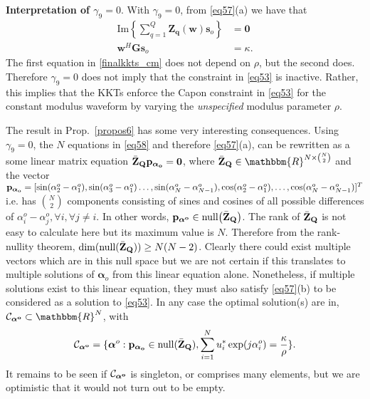 \documentclass[11pt,draftclsnofoot,onecolumn]{IEEEtran}
\theoremstyle{definition}
\theoremstyle{remark}
\begin{document}
{\bf  Interpretation of $\gamma_9=0$}. With $\gamma_9=0$, from \eqref{eq57}(a) we have that
\begin{equation} \label{finalkkts_cm}
\begin{aligned}
\mbox{Im}\left\{ \sum\limits_{q=1}^Q\mathbf{Z_q}(\mathbf{w}) \mathbf{s}_o \right\}&=\mathbf{0} \\
\mathbf{w}^H\mathbf{G}\mathbf{s}_o&=\kappa.
\end{aligned}
\end{equation}
The first equation in \eqref{finalkkts_cm} does not depend on $\rho$, but the second does. Therefore $\gamma_9=0$ does not imply that the constraint in \eqref{eq53} is inactive. Rather, this implies that the KKTs enforce the Capon constraint in \eqref{eq53} for the constant modulus waveform by varying the {\it unspecified} modulus parameter $\rho$. 

The result in Prop.~\ref{propos6} has some very interesting consequences. Using $\gamma_9=0$, the $N$ equations in \eqref{eq58} and therefore \eqref{eq57}(a), can be rewritten as a some linear matrix equation $\bar{\mathbf{Z}}_{\bf Q}\mathbf{p}_{\boldsymbol{\alpha}_{\bf o}}=\mathbf{0}$, where $\bar{\mathbf{Z}}_{\bf Q}\in\mathbbm{R}^{N\times\binom{N}{2}}$ and the vector $\mathbf{p}_{\boldsymbol{\alpha}_{\bf o}}=[\sin(\alpha_{2}^o-\alpha_{1}^o) ,\sin(\alpha_{3}^o-\alpha_{1}^o) \ldots, \sin(\alpha_{N}^o-\alpha_{N-1}^o), \cos(\alpha_{2}^o-\alpha_{1}^o),\ldots,\cos(\alpha_{N}^o-\alpha_{N-1}^o) ]^T$ i.e. has $\binom{N}{2}$ components consisting of sines and cosines of all possible differences of $\alpha_i^o-\alpha_j^o,\forall i, \forall j\neq i$. In other words, $\mathbf{p}_{\boldsymbol{\alpha}^{\bf o}}\in \mbox{null}\big( \bar{\mathbf{Z}}_{\bf Q}\big)$. The rank of $\bar{\mathbf{Z}}_{\bf Q}$ is not easy to calculate here but its maximum value is $N$. Therefore from the rank-nullity theorem, $\dim(\mbox{null}(\bar{\mathbf{Z}}_{\bf Q}))\geq N(N-2)$. Clearly there could exist multiple vectors which are in this null space but we are not certain if this translates to multiple solutions of $\boldsymbol{\alpha}_o$ from this linear equation alone. Nonetheless, if multiple solutions exist to  this linear equation, they must also satisfy \eqref{eq57}(b) to be considered as  a solution to \eqref{eq53}. In any case the optimal solution(s) are in, $\mathcal{C}_{\boldsymbol{\alpha}^{\bf o} }\subset\mathbbm{R}^{N}$, with
\begin{align}\label{eq59}
\mathcal{C}_{\boldsymbol{\alpha}^{\bf o} }=\{\boldsymbol{\alpha}^o:\mathbf{p}_{\boldsymbol{\alpha}_{\bf o}} \in \mbox{null}( \bar{\mathbf{Z}}_{\bf Q}),\sum\limits_{i=1}^N u_i^{\ast}\exp(j \alpha_i^o)=\frac{\kappa}{\rho} \}. 
\end{align}
It remains to be seen if $\mathcal{C}_{\boldsymbol{\alpha}^{\bf o} }$ is  singleton, or comprises many elements, but we are optimistic that it would not turn out to be empty.
\end{document}
